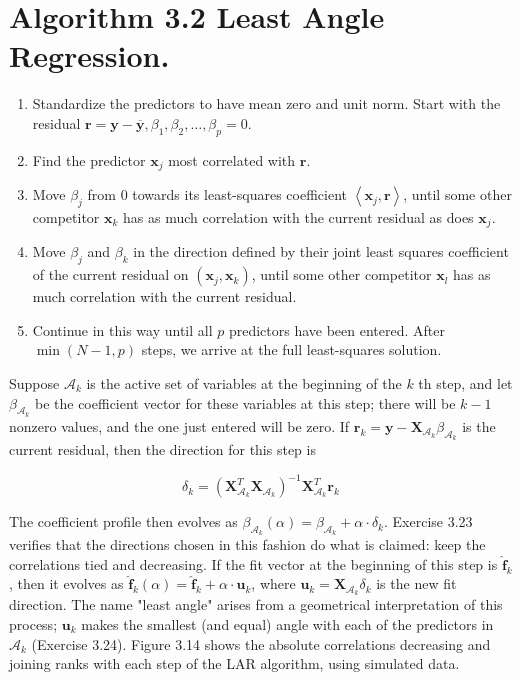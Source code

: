 \documentclass[10pt]{article}
\begin{document}
\section*{Algorithm 3.2 Least Angle Regression.}
\begin{enumerate}
  \item Standardize the predictors to have mean zero and unit norm. Start with the residual $\mathbf{r}=\mathbf{y}-\overline{\mathbf{y}}, \beta_{1}, \beta_{2}, \ldots, \beta_{p}=0$.
  \item Find the predictor $\mathbf{x}_{j}$ most correlated with $\mathbf{r}$.
  \item Move $\beta_{j}$ from 0 towards its least-squares coefficient $\left\langle\mathbf{x}_{j}, \mathbf{r}\right\rangle$, until some other competitor $\mathbf{x}_{k}$ has as much correlation with the current residual as does $\mathbf{x}_{j}$.
  \item Move $\beta_{j}$ and $\beta_{k}$ in the direction defined by their joint least squares coefficient of the current residual on $\left(\mathbf{x}_{j}, \mathbf{x}_{k}\right)$, until some other competitor $\mathbf{x}_{l}$ has as much correlation with the current residual.
  \item Continue in this way until all $p$ predictors have been entered. After $\min (N-1, p)$ steps, we arrive at the full least-squares solution.
\end{enumerate}

Suppose $\mathcal{A}_{k}$ is the active set of variables at the beginning of the $k$ th step, and let $\beta_{\mathcal{A}_{k}}$ be the coefficient vector for these variables at this step; there will be $k-1$ nonzero values, and the one just entered will be zero. If $\mathbf{r}_{k}=\mathbf{y}-\mathbf{X}_{\mathcal{A}_{k}} \beta_{\mathcal{A}_{k}}$ is the current residual, then the direction for this step is


\begin{equation*}
\delta_{k}=\left(\mathbf{X}_{\mathcal{A}_{k}}^{T} \mathbf{X}_{\mathcal{A}_{k}}\right)^{-1} \mathbf{X}_{\mathcal{A}_{k}}^{T} \mathbf{r}_{k} \tag{3.55}
\end{equation*}


The coefficient profile then evolves as $\beta_{\mathcal{A}_{k}}(\alpha)=\beta_{\mathcal{A}_{k}}+\alpha \cdot \delta_{k}$. Exercise 3.23 verifies that the directions chosen in this fashion do what is claimed: keep the correlations tied and decreasing. If the fit vector at the beginning of this step is $\hat{\mathbf{f}}_{k}$, then it evolves as $\hat{\mathbf{f}}_{k}(\alpha)=\hat{\mathbf{f}}_{k}+\alpha \cdot \mathbf{u}_{k}$, where $\mathbf{u}_{k}=\mathbf{X}_{\mathcal{A}_{k}} \delta_{k}$ is the new fit direction. The name "least angle" arises from a geometrical interpretation of this process; $\mathbf{u}_{k}$ makes the smallest (and equal) angle with each of the predictors in $\mathcal{A}_{k}$ (Exercise 3.24). Figure 3.14 shows the absolute correlations decreasing and joining ranks with each step of the LAR algorithm, using simulated data.
\end{document}
